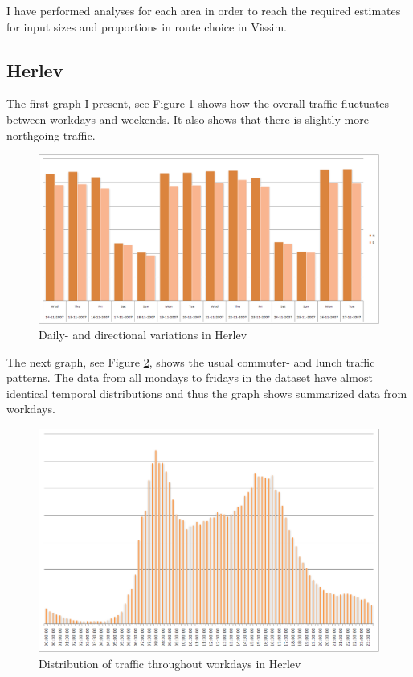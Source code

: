 I have performed analyses for each area in order to reach the required estimates for input sizes and proportions in route choice in Vissim.

\subsection{Herlev}

The first graph I present, see Figure \ref{fig:herlev_props} shows how the overall traffic fluctuates between workdays and weekends. It also shows that there is slightly more northgoing traffic.

\begin{figure}[!ht]
\begin{center}
\includegraphics[scale=0.35]{herlev_direction_proportions.png} 
\end{center}
\caption{Daily- and directional variations in Herlev}
\label{fig:herlev_props}
\end{figure}

The next graph, see Figure \ref{fig:herlev_commuter}, shows the usual commuter- and lunch traffic patterns. The data from all mondays to fridays in the dataset have almost identical temporal distributions and thus the graph shows summarized data from workdays.

\begin{figure}[!ht]
\begin{center}
\includegraphics[scale=0.4]{herlev_workday_distribution.png} 
\end{center}
\caption{Distribution of traffic throughout workdays in Herlev}
\label{fig:herlev_commuter}
\end{figure}

